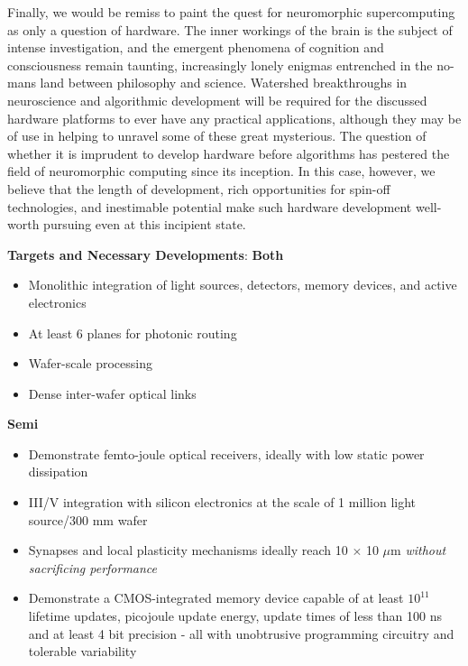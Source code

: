 \documentclass[twocolumn]{article}
\begin{document}
Finally, we would be remiss to paint the quest for neuromorphic supercomputing as only a question of hardware. The inner workings of the brain is the subject of intense investigation, and the emergent phenomena of cognition and consciousness remain taunting, increasingly lonely enigmas entrenched in the no-mans land between philosophy and science. Watershed breakthroughs in neuroscience and algorithmic development will be required for the discussed hardware platforms to ever have any practical applications, although they may be of use in helping to unravel some of these great mysterious. The question of whether it is imprudent to develop hardware before algorithms has pestered the field of neuromorphic computing since its inception. In this case, however, we believe that the length of development, rich opportunities for spin-off technologies, and inestimable potential make such hardware development well-worth pursuing even at this incipient state.  

\textbf{Targets and Necessary Developments}:
\newline
\newline
\textbf{Both}
\begin{itemize}
    \item Monolithic integration of light sources, detectors, memory devices, and active electronics
    \item At least 6 planes for photonic routing
    \item Wafer-scale processing
    \item Dense inter-wafer optical links

\end{itemize}

\textbf{Semi}
\begin{itemize}
    \item Demonstrate femto-joule optical receivers, ideally with low static power dissipation
    \item III/V integration with silicon electronics at the scale of 1 million light source/300 mm wafer
    \item Synapses and local plasticity mechanisms ideally reach 10 $\times$ 10 $\mu$m \textit{without sacrificing performance}
    \item Demonstrate a CMOS-integrated memory device capable of at least $10^{11}$ lifetime updates, picojoule update energy, update times of less than 100 ns and at least 4 bit precision - all with unobtrusive programming circuitry and tolerable variability
\end{itemize}
\end{document}
